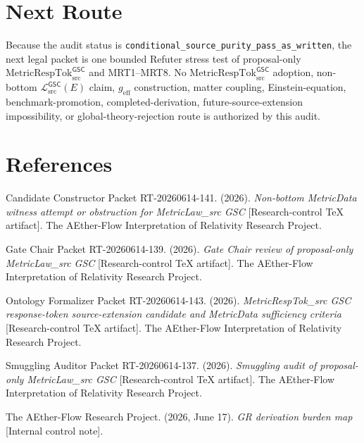\documentclass[11pt]{article}
\newcommand{\MetricRespTok}{\mathrm{MetricRespTok}_{\mathrm{src}}^{\mathsf{GSC}}}
\newcommand{\MetricData}{\mathcal{L}_{\mathrm{src}}^{\mathsf{GSC}}}
\newcommand{\geff}{g_{\mathrm{eff}}}
\begin{document}
\section{Next Route}

Because the audit status is
\texttt{conditional\_source\_purity\_pass\_as\_written}, the next legal packet
is one bounded Refuter stress test of proposal-only \(\MetricRespTok\) and
MRT1--MRT8. No \(\MetricRespTok\) adoption, non-bottom \(\MetricData(E)\)
claim, \(\geff\) construction, matter coupling, Einstein-equation,
benchmark-promotion, completed-derivation, future-source-extension
impossibility, or global-theory-rejection route is authorized by this audit.

\section*{References}

Candidate Constructor Packet RT-20260614-141. (2026). \textit{Non-bottom
MetricData witness attempt or obstruction for MetricLaw\_src GSC}
[Research-control TeX artifact]. The AEther-Flow Interpretation of Relativity
Research Project.

Gate Chair Packet RT-20260614-139. (2026). \textit{Gate Chair review of
proposal-only MetricLaw\_src GSC} [Research-control TeX artifact]. The
AEther-Flow Interpretation of Relativity Research Project.

Ontology Formalizer Packet RT-20260614-143. (2026). \textit{MetricRespTok\_src
GSC response-token source-extension candidate and MetricData sufficiency
criteria} [Research-control TeX artifact]. The AEther-Flow Interpretation of
Relativity Research Project.

Smuggling Auditor Packet RT-20260614-137. (2026). \textit{Smuggling audit of
proposal-only MetricLaw\_src GSC} [Research-control TeX artifact]. The
AEther-Flow Interpretation of Relativity Research Project.

The AEther-Flow Research Project. (2026, June 17). \textit{GR derivation
burden map} [Internal control note].
\end{document}
